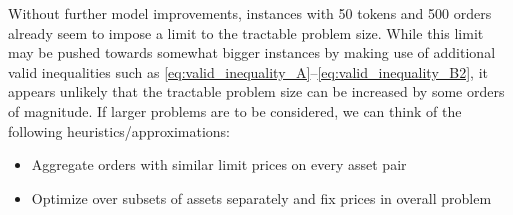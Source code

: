 \documentclass[11pt,parskip=full]{scrartcl}%
\begin{document}
Without further model improvements, instances with 50 tokens and 500 orders already seem to impose
a limit to the tractable problem size.
While this limit may be pushed towards somewhat bigger instances by making use of additional valid
inequalities such as \eqref{eq:valid_inequality_A}--\eqref{eq:valid_inequality_B2},
it appears unlikely that the tractable problem size can be increased by some orders of magnitude.
If larger problems are to be considered, we can think of the following heuristics/approximations:
\begin{itemize}
    \item Aggregate orders with similar limit prices on every asset pair
    \item Optimize over subsets of assets separately and fix prices in overall problem
\end{itemize}
\end{document}
